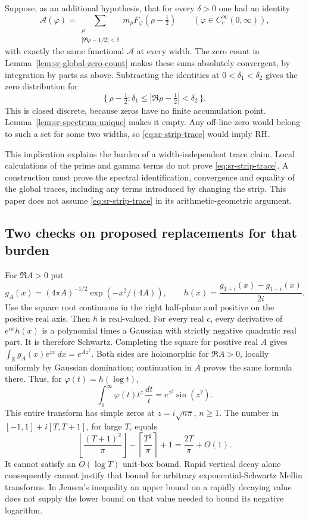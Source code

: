 Suppose, as an additional hypothesis, that for every \(\delta>0\)
one had an identity
\begin{equation}\label{eq:sr-strip-trace}
 \mathcal A(\varphi)=
  \sum_{\substack{\rho\\|\Re\rho-1/2|<\delta}}
        m_\rho F_\varphi(\rho-\tfrac12)
       \qquad(\varphi\in C_c^\infty(0,\infty)),
\end{equation}
with exactly the same functional \(\mathcal A\) at every width.
The zero count in Lemma~\ref{lem:sr-global-zero-count} makes these
sums absolutely convergent, by integration by parts as above.
Subtracting the identities at \(0<\delta_1<\delta_2\) gives the
zero distribution for
\[
 \{\,\rho-\tfrac12:
             \delta_1\leq|\Re\rho-\tfrac12|<\delta_2\,\}.
\]
This is closed discrete, because zeros have no finite accumulation
point. Lemma~\ref{lem:sr-spectrum-unique} makes it empty.
Any off-line zero would belong to such a set for some two widths,
so \eqref{eq:sr-strip-trace} would imply RH.

This implication explains the burden of a width-independent trace
claim. Local calculations of the prime and gamma terms do not prove
\eqref{eq:sr-strip-trace}. A construction must prove the spectral
identification, convergence and equality of the global traces,
including any terms introduced by changing the strip.
This paper does not assume \eqref{eq:sr-strip-trace} in its
arithmetic-geometric argument.

\subsection{Two checks on proposed replacements for that burden}
For \(\Re A>0\) put
\[
 g_A(x)=(4\pi A)^{-1/2}\exp(-x^2/(4A)),
 \qquad h(x)=\frac{g_{1+i}(x)-g_{1-i}(x)}{2i}.
\]
Use the square root continuous in the right half-plane and positive
on the positive real axis. Then \(h\) is real-valued.
For every real \(c\), every derivative of \(e^{cx}h(x)\) is a
polynomial times a Gaussian with strictly negative quadratic real
part. It is therefore Schwartz.
Completing the square for positive real \(A\) gives
\(\int_{\mathbb R}g_A(x)e^{zx}\,dx=e^{Az^2}\).
Both sides are holomorphic for \(\Re A>0\), locally uniformly by
Gaussian domination; continuation in \(A\) proves the same formula
there. Thus, for \(\varphi(t)=h(\log t)\),
\[
 \int_0^\infty\varphi(t)t^z\,\frac{dt}{t}
                  =e^{z^2}\sin(z^2).
\]
This entire transform has simple zeros at
\(z=i\sqrt{n\pi}\), \(n\geq1\).
The number in \([-1,1]+i[T,T+1]\), for large \(T\), equals
\[
 \left\lfloor\frac{(T+1)^2}{\pi}\right\rfloor
 -\left\lceil\frac{T^2}{\pi}\right\rceil+1
                  =\frac{2T}{\pi}+O(1).
\]
It cannot satisfy an \(O(\log T)\) unit-box bound.
Rapid vertical decay alone consequently cannot justify that bound
for arbitrary exponential-Schwartz Mellin transforms.
In Jensen's inequality an upper bound on a rapidly decaying value
does not supply the lower bound on that value needed to bound its
negative logarithm.


